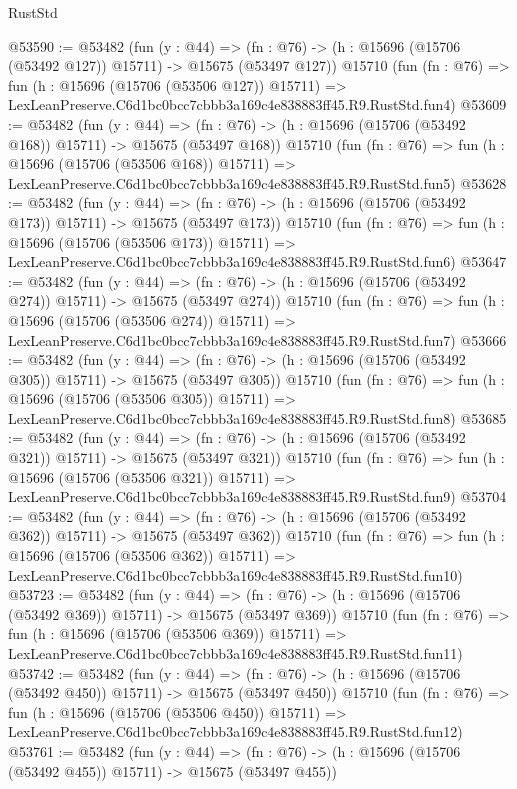 \begin{lexlean}{RustStd}
\begin{coremodule}
@53590 := @53482
    (fun (y : @44) =>
    (fn : @76) -> (h : @15696 (@15706 (@53492 @127)) @15711) -> @15675 (@53497 @127))
    @15710
    (fun (fn : @76) =>
    fun (h : @15696 (@15706 (@53506 @127)) @15711) =>
    LexLeanPreserve.C6d1bc0bcc7cbbb3a169c4e838883ff45.R9.RustStd.fun4)
@53609 := @53482
    (fun (y : @44) =>
    (fn : @76) -> (h : @15696 (@15706 (@53492 @168)) @15711) -> @15675 (@53497 @168))
    @15710
    (fun (fn : @76) =>
    fun (h : @15696 (@15706 (@53506 @168)) @15711) =>
    LexLeanPreserve.C6d1bc0bcc7cbbb3a169c4e838883ff45.R9.RustStd.fun5)
@53628 := @53482
    (fun (y : @44) =>
    (fn : @76) -> (h : @15696 (@15706 (@53492 @173)) @15711) -> @15675 (@53497 @173))
    @15710
    (fun (fn : @76) =>
    fun (h : @15696 (@15706 (@53506 @173)) @15711) =>
    LexLeanPreserve.C6d1bc0bcc7cbbb3a169c4e838883ff45.R9.RustStd.fun6)
@53647 := @53482
    (fun (y : @44) =>
    (fn : @76) -> (h : @15696 (@15706 (@53492 @274)) @15711) -> @15675 (@53497 @274))
    @15710
    (fun (fn : @76) =>
    fun (h : @15696 (@15706 (@53506 @274)) @15711) =>
    LexLeanPreserve.C6d1bc0bcc7cbbb3a169c4e838883ff45.R9.RustStd.fun7)
@53666 := @53482
    (fun (y : @44) =>
    (fn : @76) -> (h : @15696 (@15706 (@53492 @305)) @15711) -> @15675 (@53497 @305))
    @15710
    (fun (fn : @76) =>
    fun (h : @15696 (@15706 (@53506 @305)) @15711) =>
    LexLeanPreserve.C6d1bc0bcc7cbbb3a169c4e838883ff45.R9.RustStd.fun8)
@53685 := @53482
    (fun (y : @44) =>
    (fn : @76) -> (h : @15696 (@15706 (@53492 @321)) @15711) -> @15675 (@53497 @321))
    @15710
    (fun (fn : @76) =>
    fun (h : @15696 (@15706 (@53506 @321)) @15711) =>
    LexLeanPreserve.C6d1bc0bcc7cbbb3a169c4e838883ff45.R9.RustStd.fun9)
@53704 := @53482
    (fun (y : @44) =>
    (fn : @76) -> (h : @15696 (@15706 (@53492 @362)) @15711) -> @15675 (@53497 @362))
    @15710
    (fun (fn : @76) =>
    fun (h : @15696 (@15706 (@53506 @362)) @15711) =>
    LexLeanPreserve.C6d1bc0bcc7cbbb3a169c4e838883ff45.R9.RustStd.fun10)
@53723 := @53482
    (fun (y : @44) =>
    (fn : @76) -> (h : @15696 (@15706 (@53492 @369)) @15711) -> @15675 (@53497 @369))
    @15710
    (fun (fn : @76) =>
    fun (h : @15696 (@15706 (@53506 @369)) @15711) =>
    LexLeanPreserve.C6d1bc0bcc7cbbb3a169c4e838883ff45.R9.RustStd.fun11)
@53742 := @53482
    (fun (y : @44) =>
    (fn : @76) -> (h : @15696 (@15706 (@53492 @450)) @15711) -> @15675 (@53497 @450))
    @15710
    (fun (fn : @76) =>
    fun (h : @15696 (@15706 (@53506 @450)) @15711) =>
    LexLeanPreserve.C6d1bc0bcc7cbbb3a169c4e838883ff45.R9.RustStd.fun12)
@53761 := @53482
    (fun (y : @44) =>
    (fn : @76) -> (h : @15696 (@15706 (@53492 @455)) @15711) -> @15675 (@53497 @455))

\end{coremodule}
\end{lexlean}
